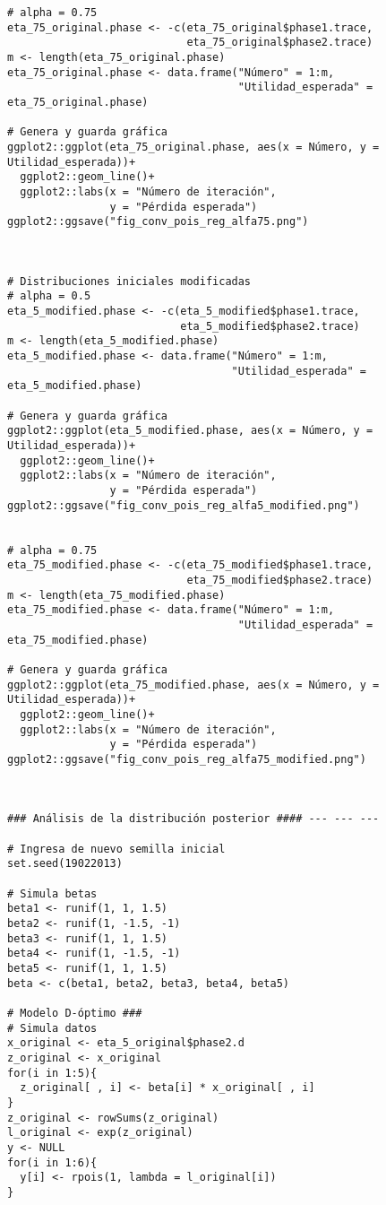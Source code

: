 \begin{lstlisting}
# alpha = 0.75
eta_75_original.phase <- -c(eta_75_original$phase1.trace, 
                            eta_75_original$phase2.trace)
m <- length(eta_75_original.phase)
eta_75_original.phase <- data.frame("Número" = 1:m, 
                                    "Utilidad_esperada" = eta_75_original.phase)

# Genera y guarda gráfica
ggplot2::ggplot(eta_75_original.phase, aes(x = Número, y = Utilidad_esperada))+
  ggplot2::geom_line()+
  ggplot2::labs(x = "Número de iteración",
                y = "Pérdida esperada")
ggplot2::ggsave("fig_conv_pois_reg_alfa75.png")



# Distribuciones iniciales modificadas
# alpha = 0.5
eta_5_modified.phase <- -c(eta_5_modified$phase1.trace, 
                           eta_5_modified$phase2.trace)
m <- length(eta_5_modified.phase)
eta_5_modified.phase <- data.frame("Número" = 1:m, 
                                   "Utilidad_esperada" = eta_5_modified.phase)

# Genera y guarda gráfica
ggplot2::ggplot(eta_5_modified.phase, aes(x = Número, y = Utilidad_esperada))+
  ggplot2::geom_line()+
  ggplot2::labs(x = "Número de iteración",
                y = "Pérdida esperada")
ggplot2::ggsave("fig_conv_pois_reg_alfa5_modified.png")


# alpha = 0.75
eta_75_modified.phase <- -c(eta_75_modified$phase1.trace, 
                            eta_75_modified$phase2.trace)
m <- length(eta_75_modified.phase)
eta_75_modified.phase <- data.frame("Número" = 1:m,
                                    "Utilidad_esperada" = eta_75_modified.phase)

# Genera y guarda gráfica
ggplot2::ggplot(eta_75_modified.phase, aes(x = Número, y = Utilidad_esperada))+
  ggplot2::geom_line()+
  ggplot2::labs(x = "Número de iteración",
                y = "Pérdida esperada")
ggplot2::ggsave("fig_conv_pois_reg_alfa75_modified.png")



### Análisis de la distribución posterior #### --- --- ---

# Ingresa de nuevo semilla inicial
set.seed(19022013)

# Simula betas
beta1 <- runif(1, 1, 1.5)
beta2 <- runif(1, -1.5, -1)
beta3 <- runif(1, 1, 1.5)
beta4 <- runif(1, -1.5, -1)
beta5 <- runif(1, 1, 1.5)
beta <- c(beta1, beta2, beta3, beta4, beta5)

# Modelo D-óptimo ###
# Simula datos
x_original <- eta_5_original$phase2.d
z_original <- x_original
for(i in 1:5){
  z_original[ , i] <- beta[i] * x_original[ , i]
}
z_original <- rowSums(z_original)
l_original <- exp(z_original)
y <- NULL
for(i in 1:6){
  y[i] <- rpois(1, lambda = l_original[i])
}



\end{lstlisting}
